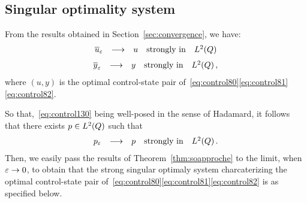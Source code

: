 \subsection{Singular optimality system}\label{sec:singularso}

From the results obtained in Section~\ref{sec:convergence}, we have:
\begin{equation*}
    \begin{array}{rclll}
        {\overline{u}}_{\varepsilon} & \longrightarrow & u & \text{strongly in} & L^{2}\!\left({Q}\right)
    \end{array}
\end{equation*}
\begin{equation*}
    \begin{array}{rclll}
        {\overline{y}}_{\varepsilon} & \longrightarrow & y & \text{strongly in} & L^{2}\!\left({Q}\right),
    \end{array}
\end{equation*}
where $(u,y)$ is the optimal control-state pair
of~\eqref{eq:control80}\eqref{eq:control81}\eqref{eq:control82}.

So that,~\eqref{eq:control130} being well-posed in the sense of Hadamard,
it follows that there exists $p\in L^{2}\!\left({Q}\right)$ such that
\begin{equation*}
    \begin{array}{rclll}
        p_{\varepsilon} & \longrightarrow & p & \text{strongly in} & L^{2}\!\left({Q}\right).
    \end{array}
\end{equation*}
Then, we easily pass the results of Theorem~\ref{thm:soapproche} to the
limit, when $\varepsilon\to 0$, to obtain that the strong singular optimaly
system charcaterizing the optimal control-state pair
of~\eqref{eq:control80}\eqref{eq:control81}\eqref{eq:control82} is as
specified below.

